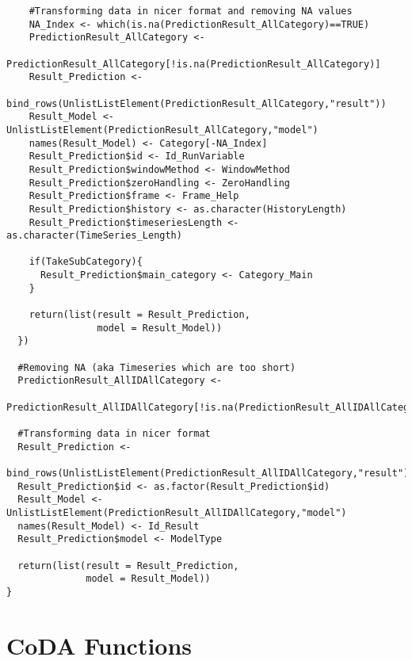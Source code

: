 \begin{verbatim}
    #Transforming data in nicer format and removing NA values
    NA_Index <- which(is.na(PredictionResult_AllCategory)==TRUE)
    PredictionResult_AllCategory <- 
							PredictionResult_AllCategory[!is.na(PredictionResult_AllCategory)]
    Result_Prediction <- 
							bind_rows(UnlistListElement(PredictionResult_AllCategory,"result"))
    Result_Model <- UnlistListElement(PredictionResult_AllCategory,"model")
    names(Result_Model) <- Category[-NA_Index]
    Result_Prediction$id <- Id_RunVariable
    Result_Prediction$windowMethod <- WindowMethod
    Result_Prediction$zeroHandling <- ZeroHandling
    Result_Prediction$frame <- Frame_Help
    Result_Prediction$history <- as.character(HistoryLength)
    Result_Prediction$timeseriesLength <- as.character(TimeSeries_Length)
    
    if(TakeSubCategory){
      Result_Prediction$main_category <- Category_Main
    }
    
    return(list(result = Result_Prediction,
                model = Result_Model))
  })

  #Removing NA (aka Timeseries which are too short)
  PredictionResult_AllIDAllCategory <- 
						PredictionResult_AllIDAllCategory[!is.na(PredictionResult_AllIDAllCategory)]
  
  #Transforming data in nicer format
  Result_Prediction <- 
							bind_rows(UnlistListElement(PredictionResult_AllIDAllCategory,"result"))
  Result_Prediction$id <- as.factor(Result_Prediction$id)
  Result_Model <- UnlistListElement(PredictionResult_AllIDAllCategory,"model")
  names(Result_Model) <- Id_Result
  Result_Prediction$model <- ModelType
  
  return(list(result = Result_Prediction,
              model = Result_Model))
}
\end{verbatim}

\section{CoDA Functions}
\label{sec:Coda Functions}

